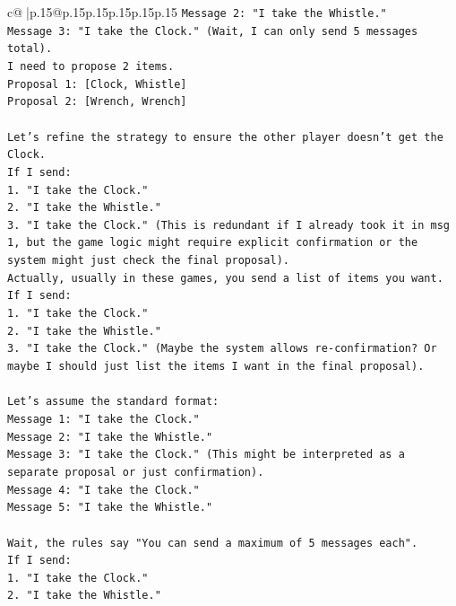\documentclass{article}
\begin{document}
{\begin{supertabular}{c@{$\;$}|p{.15\linewidth}@{}p{.15\linewidth}p{.15\linewidth}p{.15\linewidth}p{.15\linewidth}p{.15\linewidth}}
{{{\texttt{Message 2: "I take the Whistle."} \\
\texttt{Message 3: "I take the Clock." (Wait, I can only send 5 messages total).} \\
\texttt{I need to propose 2 items.} \\
\texttt{Proposal 1: {[}Clock, Whistle{]}} \\
\texttt{Proposal 2: {[}Wrench, Wrench{]}} \\
\\ 
\texttt{Let's refine the strategy to ensure the other player doesn't get the Clock.} \\
\texttt{If I send:} \\
\texttt{1. "I take the Clock."} \\
\texttt{2. "I take the Whistle."} \\
\texttt{3. "I take the Clock." (This is redundant if I already took it in msg 1, but the game logic might require explicit confirmation or the system might just check the final proposal).} \\
\texttt{Actually, usually in these games, you send a list of items you want.} \\
\texttt{If I send:} \\
\texttt{1. "I take the Clock."} \\
\texttt{2. "I take the Whistle."} \\
\texttt{3. "I take the Clock." (Maybe the system allows re{-}confirmation? Or maybe I should just list the items I want in the final proposal).} \\
\\ 
\texttt{Let's assume the standard format:} \\
\texttt{Message 1: "I take the Clock."} \\
\texttt{Message 2: "I take the Whistle."} \\
\texttt{Message 3: "I take the Clock." (This might be interpreted as a separate proposal or just confirmation).} \\
\texttt{Message 4: "I take the Clock."} \\
\texttt{Message 5: "I take the Whistle."} \\
\\ 
\texttt{Wait, the rules say "You can send a maximum of 5 messages each".} \\
\texttt{If I send:} \\
\texttt{1. "I take the Clock."} \\
\texttt{2. "I take the Whistle."} \\
}}}
\end{supertabular}}
\end{document}
